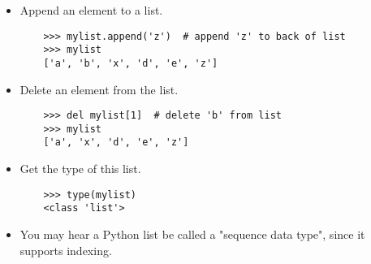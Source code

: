 \documentclass{article}
\begin{document}
\begin{itemize}
    \item Append an element to a list.
    \begin{lstlisting}
    >>> mylist.append('z')  # append 'z' to back of list
    >>> mylist
    ['a', 'b', 'x', 'd', 'e', 'z']
    \end{lstlisting}
    \item Delete an element from the list.
    \begin{lstlisting}
    >>> del mylist[1]  # delete 'b' from list
    >>> mylist
    ['a', 'x', 'd', 'e', 'z']
    \end{lstlisting}
    \item Get the type of this list.
    \begin{lstlisting}
    >>> type(mylist)
    <class 'list'>
    \end{lstlisting}
    \item You may hear a Python list be called a "sequence data type", since it supports indexing.
\end{itemize}
\end{document}
